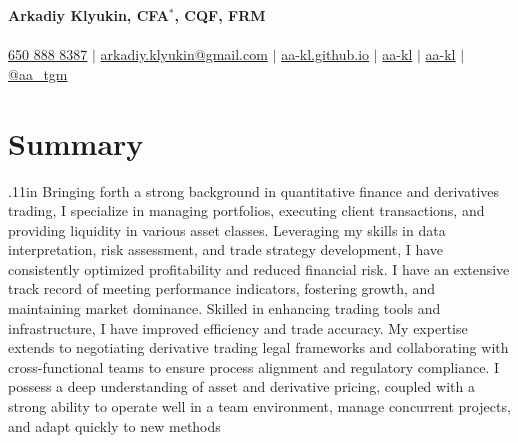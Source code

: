 \documentclass[letterpaper,hidelinks]{article}
\begin{document}

\begin{center}
  \textbf{\Huge{Arkadiy Klyukin, CFA$\mathbb{}^\ast$, CQF, FRM}\\} \\ \vspace{1pt}
  \small
  \faMobile* \hspace{.5pt} \href{tel:+16508888387}{650 888 8387}
  $|$
  \faAt \hspace{.5pt} \href{mailto:arkadiy.klyukin@gmail.com}{arkadiy.klyukin@gmail.com}
  $|$
  \faGlobeAmericas \hspace{.5pt} \href{https://aa-kl.github.io}{aa-kl.github.io}
  $|$
  \faGithub \hspace{.5pt} \href{https://github.com/aa-kl}{aa-kl}
  $|$
  \faLinkedinIn \hspace{.5pt} \href{https://www.linkedin.com/in/aa-kl}{aa-kl}
  $|$
  \faTelegramPlane \hspace{.5pt} \href{https://t.me/aa_tgm}{@aa\_tgm}
\end{center}
\vspace{-27pt}
\section{Summary}
{\hspace{0.1in}
\raggedright{\leftskip.11in
Bringing forth a strong background in quantitative finance and derivatives trading, I specialize in managing portfolios, executing client transactions, and providing liquidity in various asset classes. Leveraging my skills in data interpretation, risk assessment, and trade strategy development, I have consistently optimized profitability and reduced financial risk. I have an extensive track record of meeting performance indicators, fostering growth, and maintaining market dominance. Skilled in enhancing trading tools and infrastructure, I have improved efficiency and trade accuracy. My expertise extends to negotiating derivative trading legal frameworks and collaborating with cross-functional teams to ensure process alignment and regulatory compliance. I possess a deep understanding of asset and derivative pricing, coupled with a strong ability to operate well in a team environment, manage concurrent projects, and adapt quickly to new methods
    \\}
}
\vspace{-8pt}
\end{document}
